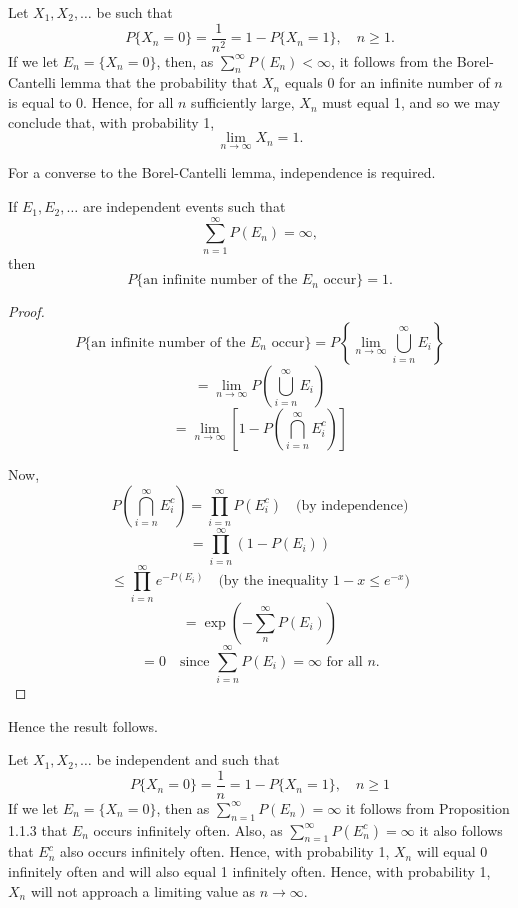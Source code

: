 \documentclass[lang=cn,10pt]{elegantbook}
\begin{document}
\begin{example}
	Let \(X_1, X_2, \ldots\) be such that
\[
P\{X_n = 0\} = \frac{1}{n^2} = 1 - P\{X_n = 1\}, \quad n \geq 1.
\]
If we let \(E_n = \{X_n = 0\}\), then, as \(\sum_{n}^{\infty} P(E_n) < \infty\), it follows from the Borel-Cantelli lemma that the probability that \(X_n\) equals 0 for an infinite number of \(n\) is equal to 0. Hence, for all \(n\) sufficiently large, \(X_n\) must equal 1, and so we may conclude that, with probability 1,
\[
\lim_{n \to \infty} X_n = 1.
\]
\end{example}
For a converse to the Borel-Cantelli lemma, independence is required.
\begin{proposition}
	If \(E_1, E_2, \ldots\) are independent events such that
\[
\sum_{n=1}^{\infty} P(E_n) = \infty,
\]
then
\[
P\{\text{an infinite number of the } E_n \text{ occur}\} = 1.
\]
\end{proposition}
\begin{proof}
	\[
P\{\text{an infinite number of the } E_n \text{ occur}\} = P\left\{\lim_{n \to \infty} \bigcup_{i=n}^{\infty} E_i\right\}
\]
\[
= \lim_{n \to \infty} P\left(\bigcup_{i=n}^{\infty} E_i\right)
\]
\[
= \lim_{n \to \infty} \left[1 - P\left(\bigcap_{i=n}^{\infty} E_i^c\right)\right]
\]

Now,
\[
P\left(\bigcap_{i=n}^{\infty} E_i^c\right) = \prod_{i=n}^{\infty} P(E_i^c) \quad \text{(by independence)}
\]
\[
= \prod_{i=n}^{\infty} (1 - P(E_i))
\]
\[
\leq \prod_{i=n}^{\infty} e^{-P(E_i)} \quad \text{(by the inequality } 1 - x \leq e^{-x} \text{)}
\]
\[
= \exp\left(-\sum_{n}^{\infty} P(E_i)\right)
\]
\[
= 0 \quad \text{since } \sum_{i=n}^{\infty} P(E_i) = \infty \text{ for all } n.
\]
\end{proof}
Hence the result follows.
\begin{example}
	Let \(X_1, X_2, \ldots\) be independent and such that
\[
P\{X_n = 0\} = \frac{1}{n} = 1 - P\{X_n = 1\}, \quad n \geq 1
\]
If we let \(E_n = \{X_n = 0\}\), then as \(\sum_{n=1}^{\infty} P(E_n) = \infty\) it follows from Proposition 1.1.3 that \(E_n\) occurs infinitely often. Also, as \(\sum_{n=1}^{\infty} P(E_n^c) = \infty\) it also follows that \(E_n^c\) also occurs infinitely often. Hence, with probability 1, \(X_n\) will equal 0 infinitely often and will also equal 1 infinitely often. Hence, with probability 1, \(X_n\) will not approach a limiting value as \(n \to \infty\).
\end{example}
\end{document}

